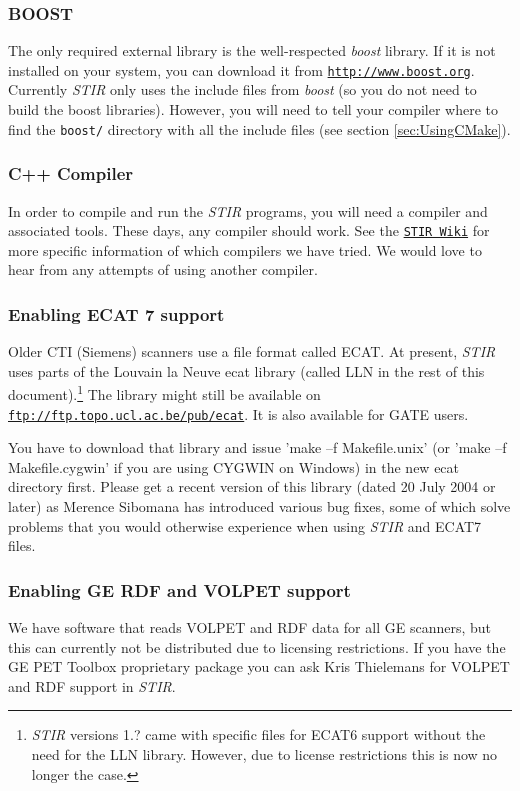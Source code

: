 \documentclass{article}
\def\url#1#2{\mbox{\href{#1}{\tt #2}}}
\begin{document}
\subsubsection{BOOST}
The only required external library is the well-respected \textit{boost} library. If it
is not installed on your system, you can download it from 
\url{http://www.boost.org}{http://www.boost.org}. Currently \textit{STIR} only
uses the include files from \textit{boost} (so you do not need to build
the boost libraries). However, you will need to tell your compiler
where to find the \texttt{boost/} directory with all the include files
(see section \ref{sec:UsingCMake}).


\subsubsection{
C++ Compiler}

In order to compile and run the \textit{STIR} programs, you will need a compiler
and associated tools. These days, any compiler should work. See the 
\url{http://sourceforge.net/stir}{STIR Wiki} for more
specific information of which compilers we have tried.
We would love 
to hear from any attempts of using another compiler. 

\subsubsection{
Enabling ECAT 7 support}
\label{sec:ECAT67support}
Older CTI (Siemens) scanners use a file format called ECAT\texttrademark{}.
At present, \textit{STIR} uses parts of the Louvain la Neuve ecat library (called LLN in
the rest of this document).\footnote{\textit{STIR} versions 1.? came with
specific files for ECAT6 support without the need for the LLN library. 
However, due to license restrictions this is now no longer the case.} 
The library might still be available on  
\url{ftp://ftp.topo.ucl.ac.be/pub/ecat }{ftp://ftp.topo.ucl.ac.be/pub/ecat}.
It is also available for GATE users.

You have to download that library and issue 'make --f Makefile.unix' 
(or 'make --f Makefile.cygwin' if you are using CYGWIN on Windows) 
in the new ecat directory first. Please get a recent version 
of this library (dated 20 July 2004 or later) as Merence Sibomana 
has introduced various bug fixes, some of which solve problems 
that you would otherwise experience when using \textit{STIR} and ECAT7 
files.

\subsubsection{
Enabling GE RDF and VOLPET support}
\label{sec:RDFsupport}
We have software that reads VOLPET and RDF data for all GE scanners, but this can currently
not be distributed due to licensing restrictions. If you have the
GE PET Toolbox proprietary package you can ask Kris Thielemans for VOLPET and RDF
support in \textit{STIR}.
\end{document}
